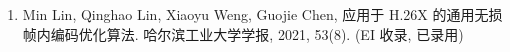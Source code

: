 \begin{publications}
    \begin{enumerate}
        \item Min Lin, Qinghao Lin, Xiaoyu Weng, Guojie Chen,
              应用于 H.26X 的通用无损帧内编码优化算法.
              哈尔滨工业大学学报, 2021, 53(8). (EI 收录, 已录用)

    \end{enumerate}

\end{publications}